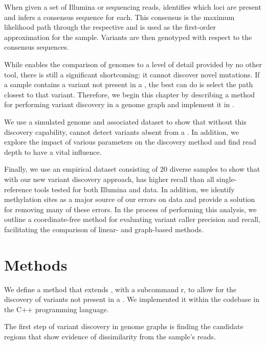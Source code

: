 When given a set of Illumina or \ont{} sequencing reads, \pandora{} identifies which \panrg{} loci are present and infers a consensus sequence for each. This consensus is the maximum likelihood path through the respective \prg{} and is used as the first-order approximation for the sample. Variants are then genotyped with respect to the consensus sequences. 

While \pandora{} enables the comparison of genomes to a level of detail provided by no other tool, there is still a significant shortcoming: it cannot discover novel mutations. If a sample contains a variant not present in a \prg{}, the best \pandora{} can do is select the path closest to that variant. Therefore, we begin this chapter by describing a method for performing \denovo{} variant discovery in a genome graph and implement it in \pandora{}.

We use a simulated genome and associated \ont{} dataset to show that without this discovery capability, \pandora{} cannot detect variants absent from a \prg{}. In addition, we explore the impact of various parameters on the \denovo{} discovery method and find read depth to have a vital influence.

Finally, we use an empirical dataset consisting of 20 diverse \ecoli{} samples to show that with our new variant discovery approach, \pandora{} has higher recall than all single-reference tools tested for both Illumina and \ont{} data. In addition, we identify methylation sites as a major source of our errors on \ont{} data and provide a solution for removing many of these errors. In the process of performing this analysis, we outline a coordinate-free method for evaluating variant caller precision and recall, facilitating the comparison of linear- and graph-based methods. 

\section{Methods}
\label{sec:denovo-method}

We define a method that extends \pandora{}, with a subcommand r, to allow for the \denovo{} discovery of variants not present in a \prg{}. We implemented it within the \pandora{} codebase in the C++ programming language. 

The first step of \denovo{} variant discovery in genome graphs is finding the candidate regions that show evidence of dissimilarity from the sample's reads.

